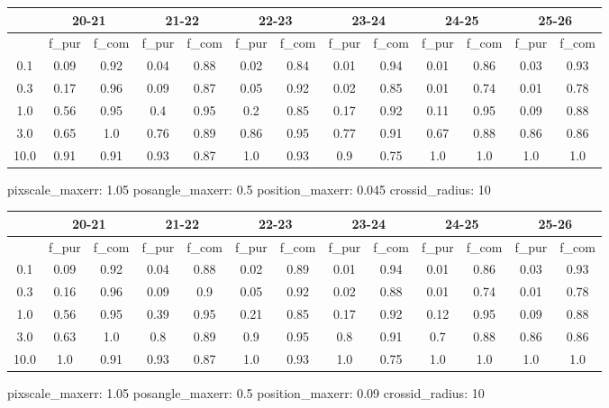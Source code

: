\documentclass{article}
\begin{document}
\begin{figure}[H]
\centering
\begin{tabular}{|c|c|c|c|c|c|c|c|c|c|c|c|c|}
\hline
\multicolumn{1}{|c|}{} & \multicolumn{2}{|c|}{20-21} & \multicolumn{2}{|c|}{21-22} & \multicolumn{2}{|c|}{22-23} & \multicolumn{2}{|c|}{23-24} & \multicolumn{2}{|c|}{24-25} & \multicolumn{2}{|c|}{25-26}\\
\hline \hline
 & f\_pur & f\_com & f\_pur & f\_com & f\_pur & f\_com & f\_pur & f\_com & f\_pur & f\_com & f\_pur & f\_com \\
\hline
0.1 & 0.09 & 0.92 & 0.04 & 0.88 & 0.02 & 0.84 & 0.01 & 0.94 & 0.01 & 0.86 & 0.03 & 0.93\\
\hline
0.3 & 0.17 & 0.96 & 0.09 & 0.87 & 0.05 & 0.92 & 0.02 & 0.85 & 0.01 & 0.74 & 0.01 & 0.78\\
\hline
1.0 & 0.56 & 0.95 & 0.4 & 0.95 & 0.2 & 0.85 & 0.17 & 0.92 & 0.11 & 0.95 & 0.09 & 0.88\\
\hline
3.0 & 0.65 & 1.0 & 0.76 & 0.89 & 0.86 & 0.95 & 0.77 & 0.91 & 0.67 & 0.88 & 0.86 & 0.86\\
\hline
10.0 & 0.91 & 0.91 & 0.93 & 0.87 & 1.0 & 0.93 & 0.9 & 0.75 & 1.0 & 1.0 & 1.0 & 1.0\\
\hline
\end{tabular}
\caption{pixscale\_maxerr: 1.05 posangle\_maxerr: 0.5 position\_maxerr: 0.045 crossid\_radius: 10}
\end{figure}

\begin{figure}[H]
\centering
\begin{tabular}{|c|c|c|c|c|c|c|c|c|c|c|c|c|}
\hline
\multicolumn{1}{|c|}{} & \multicolumn{2}{|c|}{20-21} & \multicolumn{2}{|c|}{21-22} & \multicolumn{2}{|c|}{22-23} & \multicolumn{2}{|c|}{23-24} & \multicolumn{2}{|c|}{24-25} & \multicolumn{2}{|c|}{25-26}\\
\hline \hline
 & f\_pur & f\_com & f\_pur & f\_com & f\_pur & f\_com & f\_pur & f\_com & f\_pur & f\_com & f\_pur & f\_com \\
\hline
0.1 & 0.09 & 0.92 & 0.04 & 0.88 & 0.02 & 0.89 & 0.01 & 0.94 & 0.01 & 0.86 & 0.03 & 0.93\\
\hline
0.3 & 0.16 & 0.96 & 0.09 & 0.9 & 0.05 & 0.92 & 0.02 & 0.88 & 0.01 & 0.74 & 0.01 & 0.78\\
\hline
1.0 & 0.56 & 0.95 & 0.39 & 0.95 & 0.21 & 0.85 & 0.17 & 0.92 & 0.12 & 0.95 & 0.09 & 0.88\\
\hline
3.0 & 0.63 & 1.0 & 0.8 & 0.89 & 0.9 & 0.95 & 0.8 & 0.91 & 0.7 & 0.88 & 0.86 & 0.86\\
\hline
10.0 & 1.0 & 0.91 & 0.93 & 0.87 & 1.0 & 0.93 & 1.0 & 0.75 & 1.0 & 1.0 & 1.0 & 1.0\\
\hline
\end{tabular}
\caption{pixscale\_maxerr: 1.05 posangle\_maxerr: 0.5 position\_maxerr: 0.09 crossid\_radius: 10}
\end{figure}
\end{document}
